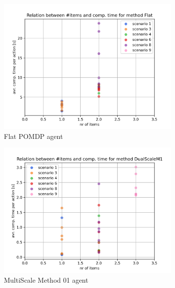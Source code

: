 \begin{figure}
    \centering
    \begin{subfigure}[b]{0.49\textwidth}
        \includegraphics[width=\textwidth]{Report/images/nr_of_items/items_vs_comptime_Flat.png}
        \caption{Flat POMDP agent}
        \label{subfig:nr_of_items_Flat}
    \end{subfigure}
    \begin{subfigure}[b]{0.49\textwidth}
         \includegraphics[width=\textwidth]{Report/images/nr_of_items/items_vs_comptime_DualScaleM1.png}
        \caption{MultiScale Method 01 agent}
        \label{subfig:nr_of_items_D1}
    \end{subfigure}
    \hfill
    \begin{subfigure}[b]{0.49\textwidth}

\end{subfigure}
\end{figure}
